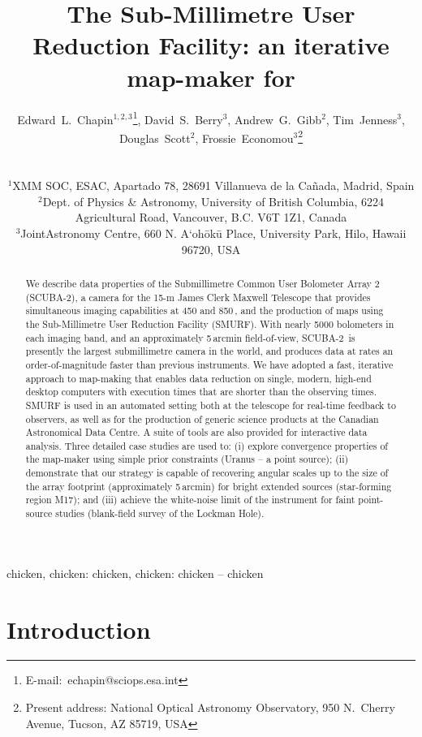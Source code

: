 \documentclass[useAMS,usenatbib,nofootinbib]{mn2e}
\title[SMURF: an iterative map-maker for \scuba]{The Sub-Millimetre User
Reduction Facility: an iterative map-maker for \scuba}
\author[Edward~L.~Chapin~et~al.]{
  \parbox[t]{\textwidth}{
    Edward~L.~Chapin$^{1,2,3}$\thanks{E-mail:~echapin@sciops.esa.int},
    David~S.~Berry$^{3}$,
    Andrew~G.~Gibb$^{2}$,
    Tim~Jenness$^{3}$,
    Douglas~Scott$^{2}$,
    Frossie~Economou$^3$\thanks{Present address: National Optical
      Astronomy Observatory, 950 N.\ Cherry Avenue, Tucson, AZ 85719, USA}
  }
  \\
  \\
  $^{1}$XMM SOC, ESAC, Apartado 78, 28691 Villanueva de la Ca\~nada, Madrid,
  Spain\\
  $^{2}$Dept. of Physics \& Astronomy, University of British Columbia,
  6224 Agricultural Road, Vancouver, B.C. V6T 1Z1, Canada\\
  $^{3}$JointAstronomy Centre, 660 N. A`oh\={o}k\={u} Place, University
  Park, Hilo, Hawaii 96720, USA}
\newcommand{\scuba}{SCUBA-2}
\begin{document}
\label{firstpage}

\maketitle

\begin{abstract}
  We describe data properties of the Submillimetre Common User
  Bolometer Array 2 (\scuba), a camera for the 15-m James Clerk
  Maxwell Telescope that provides simultaneous imaging capabilities at
  450 and 850\,\micron, and the production of maps using the
  Sub-Millimetre User Reduction Facility (SMURF). With nearly 5000
  bolometers in each imaging band, and an approximately 5\,arcmin
  field-of-view, \scuba\ is presently the largest submillimetre camera
  in the world, and produces data at rates an order-of-magnitude
  faster than previous instruments. We have adopted a fast, iterative
  approach to map-making that enables data reduction on single,
  modern, high-end desktop computers with execution times that are
  shorter than the observing times.  SMURF is used in an automated
  setting both at the telescope for real-time feedback to observers,
  as well as for the production of generic science products at the
  Canadian Astronomical Data Centre. A suite of tools are also
  provided for interactive data analysis.  Three detailed case studies
  are used to: (i) explore convergence properties of the map-maker
  using simple prior constraints (Uranus -- a point source); (ii)
  demonstrate that our strategy is capable of recovering angular
  scales up to the size of the array footprint (approximately
  5\,arcmin) for bright extended sources (star-forming region M17);
  and (iii) achieve the white-noise limit of the instrument for faint
  point-source studies (blank-field survey of the Lockman Hole).
\end{abstract}


\begin{keywords}
chicken, chicken: chicken, chicken: chicken -- chicken
\end{keywords}

\section{Introduction}
\label{sec:intro}

\end{document}
